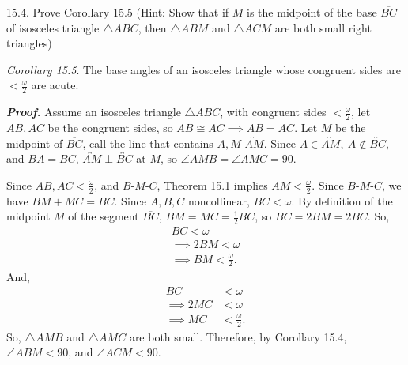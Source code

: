\documentclass{report}
\begin{document}
    \bigbreak \noindent 
    \begin{mdframed}
        15.4. Prove Corollary 15.5 (Hint: Show that if $M$ is the midpoint of the base $\overline{BC}$ of isosceles triangle $\triangle ABC$, then $ \triangle ABM$  and $\triangle ACM$ are both small right triangles)
    \end{mdframed}
    \bigbreak \noindent 
    \begin{remark}
        \textit{Corollary 15.5}. The base angles of an isosceles triangle whose congruent sides are $< \frac{\omega}{2}$ are acute.
    \end{remark}
    \bigbreak \noindent 
    \textbf{\textit{Proof.}} Assume an isosceles triangle $ \triangle ABC$, with congruent sides $< \frac{\omega}{2}$, let $AB, AC$ be the congruent sides, so $\overline{AB} \cong \overline{AC} \implies AB = AC$. 
    \bigbreak \noindent 
    Let $M$ be the midpoint of $\overline{BC}$, call the line that contains $A,M$ $ \overleftrightarrow{AM}$. Since $A \in \overleftrightarrow{AM},\ A \not\in \overleftrightarrow{BC}$, and $BA = BC$, $ \overleftrightarrow{AM} \perp \overleftrightarrow{BC}$ at $M$, so $\angle AMB = \angle AMC = 90$.
    \bigbreak \noindent 
    \begin{figure}[ht]
        \centering
        \label{fig:iso}
    \end{figure}
    \bigbreak \noindent 
    Since $AB, AC < \frac{\omega}{2}$, and $ B\text{-}M\text{-}C$, Theorem 15.1 implies $ AM < \frac{\omega}{2}$. Since $ B\text{-}M\text{-}C$, we have $ BM + MC = BC$. Since $A,B,C$ noncollinear, $BC < \omega$. By definition of the midpoint $M$ of the segment $ \overline{BC}$, $ BM = MC = \frac{1}{2}BC$, so $BC = 2BM = 2BC$. So,
    \begin{align*}
        BC < \omega \\
        \implies 2BM < \omega \\
        \implies BM < \frac{\omega}{2}
    .\end{align*}
    And,
    \begin{align*}
        BC &< \omega \\
        \implies 2MC &< \omega \\
        \implies MC &< \frac{\omega}{2}
    .\end{align*}
    So, $\triangle AMB$ and $ \triangle AMC$ are both small.
    \bigbreak \noindent 
    Therefore, by Corollary 15.4, $\angle ABM < 90$, and $\angle ACM  < 90$. \endpf
\end{document}
